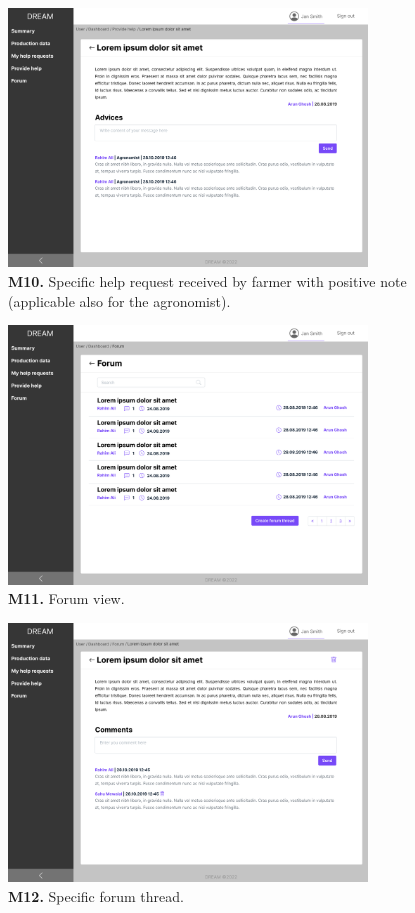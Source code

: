 \begin{figure}[H]
    \centering
    \includegraphics[width=0.85\textwidth]{mockups/Farmer_Dashboard_Provide help_Request.png}
    \caption{\textbf{M10.} Specific help request received by farmer with positive note (applicable also for the agronomist).}
\end{figure}

\begin{figure}[H]
    \centering
    \includegraphics[width=0.85\textwidth]{mockups/Farmer_Dashboard_Forum.png}
    \caption{\textbf{M11.} Forum view.}
\end{figure}

\begin{figure}[H]
    \centering
    \includegraphics[width=0.85\textwidth]{mockups/Farmer_Dashboard_Forum_Thread.png}
    \caption{\textbf{M12.} Specific forum thread.}
\end{figure}


